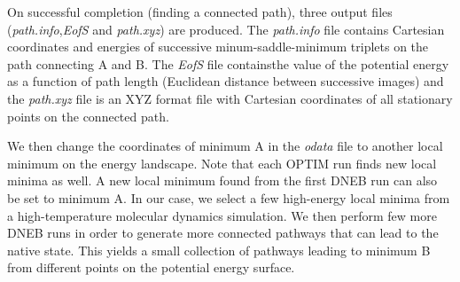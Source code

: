 \documentclass[journal=jacsat]{achemso}
\begin{document}
On successful completion (finding a connected path), three output files (\emph{path.info},\emph{EofS} and \emph{path.xyz}) are produced. The \emph{path.info} file contains Cartesian coordinates and energies of successive minum-saddle-minimum triplets on the path connecting A and B. The \emph{EofS} file containsthe value of the potential energy as a function of path length (Euclidean distance between successive images) and the \emph{path.xyz} file is an XYZ format file with Cartesian coordinates of all stationary points on the connected path. 

We then change the coordinates of minimum A in the \emph{odata} file to another local minimum on the energy landscape. Note that each OPTIM run finds new local minima as well. A new local minimum found from the first DNEB run can also be set to minimum A. In our case, we select a few high-energy local minima from a high-temperature molecular dynamics simulation. We then perform few more DNEB runs in order to generate more connected pathways that can lead to the native state. This yields a small collection of pathways leading to minimum B from different points on the potential energy surface. 
\end{document}
